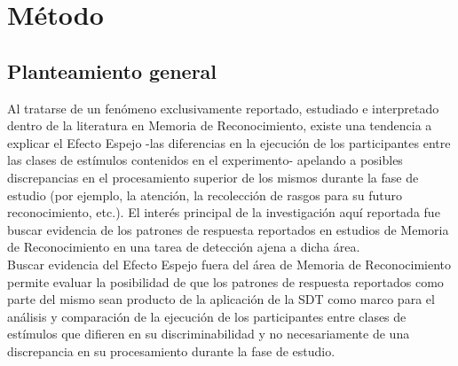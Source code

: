 
\chapter{Método} %

\label{Cap_Exp} %

\section{Planteamiento general}

Al tratarse de un fenómeno exclusivamente reportado, estudiado e interpretado dentro de la literatura en Memoria de Reconocimiento, existe una tendencia a explicar el Efecto Espejo -las diferencias en la ejecución de los participantes entre las clases de estímulos contenidos en el experimento- apelando a posibles discrepancias en el procesamiento superior de los mismos durante la fase de estudio (por ejemplo, la atención, la recolección de rasgos para su futuro reconocimiento, etc.). El interés principal de la investigación aquí reportada fue buscar evidencia de los patrones de respuesta reportados en estudios de Memoria de Reconocimiento en una tarea de detección ajena a dicha área.\\

Buscar evidencia del Efecto Espejo fuera del área de Memoria de Reconocimiento permite evaluar la posibilidad de que los patrones de respuesta reportados como parte del mismo sean producto de la aplicación de la SDT como marco para el análisis y comparación de la ejecución de los participantes entre clases de estímulos que difieren en su discriminabilidad y no necesariamente de una discrepancia en su procesamiento durante la fase de estudio.\\

